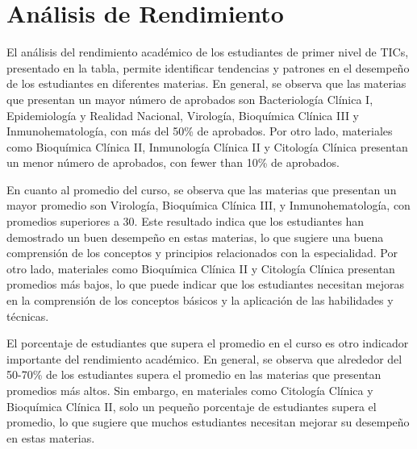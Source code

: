 \vspace{1cm}
\section{Análisis de Rendimiento}
El análisis del rendimiento académico de los estudiantes de primer nivel de TICs, presentado en la tabla, permite identificar tendencias y patrones en el desempeño de los estudiantes en diferentes materias. En general, se observa que las materias que presentan un mayor número de aprobados son Bacteriología Clínica I, Epidemiología y Realidad Nacional, Virología, Bioquímica Clínica III y Inmunohematología, con más del 50\% de aprobados. Por otro lado, materiales como Bioquímica Clínica II, Inmunología Clínica II y Citología Clínica presentan un menor número de aprobados, con fewer than 10\% de aprobados.

En cuanto al promedio del curso, se observa que las materias que presentan un mayor promedio son Virología, Bioquímica Clínica III, y Inmunohematología, con promedios superiores a 30. Este resultado indica que los estudiantes han demostrado un buen desempeño en estas materias, lo que sugiere una buena comprensión de los conceptos y principios relacionados con la especialidad. Por otro lado, materiales como Bioquímica Clínica II y Citología Clínica presentan promedios más bajos, lo que puede indicar que los estudiantes necesitan mejoras en la comprensión de los conceptos básicos y la aplicación de las habilidades y técnicas.

El porcentaje de estudiantes que supera el promedio en el curso es otro indicador importante del rendimiento académico. En general, se observa que alrededor del 50-70\% de los estudiantes supera el promedio en las materias que presentan promedios más altos. Sin embargo, en materiales como Citología Clínica y Bioquímica Clínica II, solo un pequeño porcentaje de estudiantes supera el promedio, lo que sugiere que muchos estudiantes necesitan mejorar su desempeño en estas materias.

